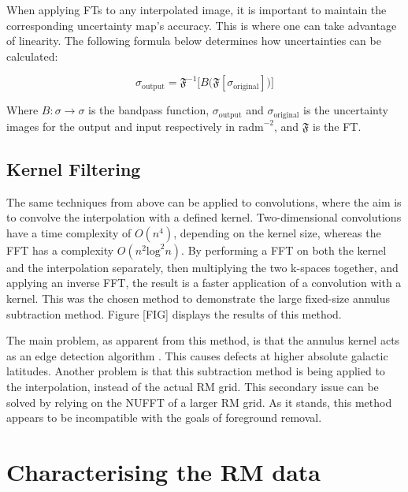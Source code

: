 When applying FTs to any interpolated image, it is important to maintain the corresponding uncertainty map's accuracy. This is where one can take advantage of linearity. The following formula below determines how uncertainties can be calculated:


\begin{equation}
    \sigma_{\mathrm{output}} = \mathbf{\mathfrak{F}}^{-1} \biggl[ B \bigl( \mathbf{\mathfrak{F}} \left[ \sigma_{\mathrm{original}} \right] \bigr) \biggr]
    \label{eq:ft_unc}
\end{equation}


Where $B\colon\sigma\rightarrow\sigma$ is the bandpass function, $\sigma_{\mathrm{output}}$ and $\sigma_{\mathrm{original}}$ is the uncertainty images for the output and input respectively in $\mathrm{rad m}^{-2}$, and $\mathbf{\mathfrak{F}}$ is the FT.

\subsection{Kernel Filtering}
\label{ssec:kernel}

The same techniques from above can be applied to convolutions, where the aim is to convolve the interpolation with a defined kernel. Two-dimensional convolutions have a time complexity of $O(n^4)$, depending on the kernel size, whereas the FFT has a complexity $O(n^2 \mathrm{log}^2 n)$. By performing a FFT on both the kernel and the interpolation separately, then multiplying the two k-spaces together, and applying an inverse FFT, the result is a faster application of a convolution with a kernel. This was the chosen method to demonstrate the large fixed-size annulus subtraction method. Figure [FIG] displays the results of this method.


The main problem, as apparent from this method, is that the annulus kernel acts as an edge detection algorithm \citep{ID38}. This causes defects at higher absolute galactic latitudes. Another problem is that this subtraction method is being applied to the interpolation, instead of the actual RM grid. This secondary issue can be solved by relying on the NUFFT of a larger RM grid. As it stands, this method appears to be incompatible with the goals of foreground removal.

\section{Characterising the RM data}
\label{sec:charm}

